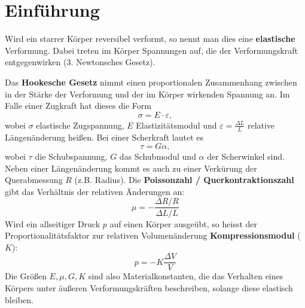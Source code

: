 \section{Einführung}
Wird ein starrer Körper reversibel verformt, so nennt man dies eine \textbf{elastische} Verformung.
Dabei treten im Körper Spannungen auf, die der Verformungskraft entgegenwirken (3. Newtonsches Gesetz).

Das \textbf{Hookesche Gesetz} nimmt einen proportionalen Zusammenhang zwischen in der Stärke der Verformung und der im Körper wirkenden Spannung an.
Im Falle einer Zugkraft hat dieses die Form
\begin{equation}
  \sigma = E\cdot \varepsilon,
  \label{eq:hookzug}
\end{equation}
wobei $\sigma$ elastische Zugspannung, $E$ Elastizitätsmodul und $\varepsilon=\frac{\Delta L}{L}$ relative Längenänderung heißen.
Bei einer Scherkraft lautet es
\begin{equation}
  \tau = G\alpha,
  \label{eq:hookscher}
\end{equation}
wobei $\tau$ die Schubspannung, $G$ das Schubmodul und $\alpha$ der Scherwinkel sind. \\

Neben einer Längenänderung kommt es auch zu einer Verkürung der Querabmessung $R$ (z.B. Radius). Die \textbf{Poissonzahl / Querkontraktionszahl} gibt das Verhältnis der relativen Änderungen an:
\begin{equation}
  \mu=-\frac{\Delta R/R}{\Delta L/L}
  \label{eq:poisson}
\end{equation}
Wird ein allseitiger Druck $p$ auf einen Körper ausgeübt, so heisst der Proportionalitätsfaktor zur relativen Volumenänderung \textbf{Kompressionsmodul} ($K$):
\begin{equation}
  p=-K \frac{\Delta V}{V}
  \label{eq:kompression}
\end{equation}
Die Größen $E, \mu, G, K$ sind also Materialkonstanten, die das Verhalten eines Körpers unter äußeren Verformungskräften beschreiben, solange diese elastisch bleiben. \\

